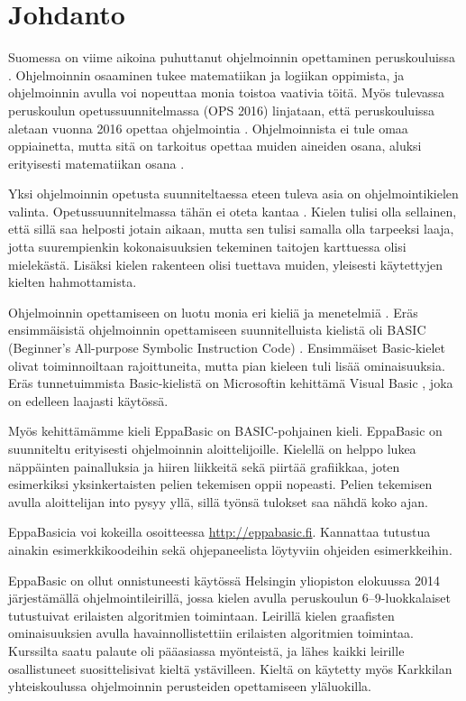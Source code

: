 
\section{Johdanto}
Suomessa on viime aikoina
puhuttanut ohjelmoinnin
opettaminen peruskouluissa
\cite{hs_kiuru}\cite{hs_eka}.
Ohjelmoinnin osaaminen
tukee matematiikan ja logiikan
oppimista, ja ohjelmoinnin
avulla voi nopeuttaa monia
toistoa vaativia töitä.
Myös tulevassa peruskoulun
opetussuunnitelmassa (OPS 2016)
linjataan, että peruskouluissa aletaan
vuonna 2016 opettaa ohjelmointia
\cite{OPS_2016}.
Ohjelmoinnista ei tule omaa oppiainetta,
mutta sitä on tarkoitus opettaa muiden
aineiden osana, aluksi erityisesti
matematiikan osana \cite{OPS_2016}\cite{hs_eka}.

Yksi ohjelmoinnin opetusta suunniteltaessa eteen tuleva
asia on ohjelmointikielen valinta.
Opetussuunnitelmassa tähän ei
oteta kantaa \cite{hs_eka}.
Kielen tulisi olla sellainen,
että sillä saa helposti jotain aikaan,
mutta sen tulisi samalla olla tarpeeksi laaja,
jotta suurempienkin kokonaisuuksien tekeminen
taitojen karttuessa olisi mielekästä.
Lisäksi kielen rakenteen olisi tuettava muiden,
yleisesti käytettyjen kielten hahmottamista.

Ohjelmoinnin opettamiseen
on luotu monia eri kieliä ja menetelmiä
\cite{language_history}.
Eräs ensimmäisistä ohjelmoinnin opettamiseen
suunnitelluista kielistä oli BASIC
(Beginner's All-purpose Symbolic Instruction Code)
\cite{basic}.
Ensimmäiset Basic-kielet olivat toiminnoiltaan rajoittuneita,
mutta pian kieleen tuli lisää ominaisuuksia.
Eräs tunnetuimmista Basic-kielistä on
Microsoftin kehittämä Visual Basic
\cite{vb.net},
joka on edelleen laajasti käytössä.

Myös kehittämämme kieli EppaBasic
on BASIC-pohjainen kieli.
EppaBasic on suunniteltu
erityisesti ohjelmoinnin aloittelijoille.
Kielellä on helppo lukea
näppäinten painalluksia
ja hiiren liikkeitä
sekä piirtää grafiikkaa,
joten esimerkiksi yksinkertaisten
pelien tekemisen oppii nopeasti.
Pelien tekemisen avulla aloittelijan into pysyy yllä,
sillä työnsä tulokset saa nähdä koko ajan.

EppaBasicia voi kokeilla osoitteessa
\url{http://eppabasic.fi}.
Kannattaa tutustua ainakin esimerkkikoodeihin
sekä ohjepaneelista löytyviin
ohjeiden esimerkkeihin.

EppaBasic on ollut onnistuneesti käytössä
Helsingin yliopiston elokuussa 2014
järjestämällä ohjelmointileirillä,
jossa kielen avulla peruskoulun
6--9-luokkalaiset
tutustuivat erilaisten algoritmien toimintaan.
Leirillä kielen graafisten ominaisuuksien
avulla havainnollistettiin erilaisten
algoritmien toimintaa.
Kurssilta saatu palaute oli pääasiassa myönteistä,
ja lähes kaikki leirille osallistuneet
suosittelisivat kieltä ystävilleen.
Kieltä on käytetty myös Karkkilan yhteiskoulussa
ohjelmoinnin perusteiden opettamiseen yläluokilla.


